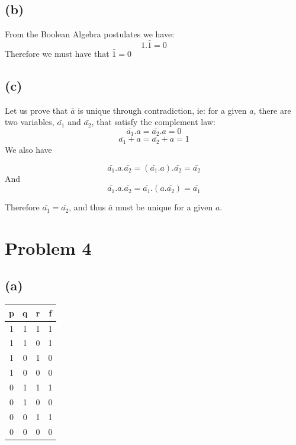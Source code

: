 \documentclass[12pt]{article}
\begin{document}
\subsection*{(b)}
From the Boolean Algebra postulates we have: 
$$1.\bar{1}=0$$
Therefore we must have that $\bar{1}=0$
\subsection*{(c)}

Let us prove that $\bar{a}$ is unique through contradiction, ie: for a given $a$, there are
two variables, $\bar{a_1}$ and $\bar{a_2}$, that satisfy the complement law:
$$\bar{a_1}.a=\bar{a_2}.a=0$$
$$\bar{a_1}+a=\bar{a_2}+a=1$$
We also have

$$\bar{a_1}.a.\bar{a_2}=(\bar{a_1}.a).\bar{a_2}=\bar{a_2}$$
And
$$\bar{a_1}.a.\bar{a_2}=\bar{a_1}.(a.\bar{a_2})=\bar{a_1}$$

Therefore $\bar{a_1}=\bar{a_2}$, and thus $\bar{a}$ must be unique for a given $a$.
\section*{Problem 4}
\subsection*{(a)}
\begin{center}
    \begin{tabular}{ |c|c|c||c| }
        p & q & r  & f\\
        \hline
        1 & 1 & 1 & 1\\
        \hline
        1 & 1 & 0 & 1\\
        \hline
        1 & 0 & 1 & 0\\
        \hline
        1 & 0 & 0 & 0\\
        \hline
        0 & 1 & 1 & 1\\
        \hline
        0 & 1 & 0 & 0\\
        \hline
        0 & 0 & 1 & 1\\
        \hline
        0 & 0 & 0 & 0\\
        \hline

    \end{tabular}
\end{center}
\end{document}
